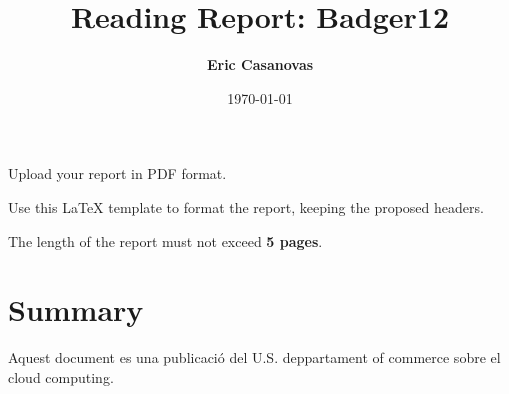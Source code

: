\documentclass[a4paper, 10pt]{article}
\title{Reading Report: Badger12}
\author{\textbf{Eric Casanovas}}
\date{\normalsize\today{}}
\begin{document}
\maketitle

\begin{center}
  Upload your report in PDF format.
  
  Use this LaTeX template to format the report, keeping the proposed headers.
  
	The length of the report must not exceed \textbf{5 pages}.
\end{center}

\section{Summary}
    Aquest document es una publicació del U.S. deppartament of commerce sobre el cloud computing.
    
\end{document}
